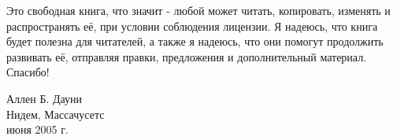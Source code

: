Это свободная книга, что значит - любой может читать, копировать,
изменять и распространять её, при условии соблюдения лицензии.
Я надеюсь, что книга будет полезна для читателей, а также я надеюсь, что
они помогут продолжить развивать её, отправляя правки, предложения
и дополнительный материал.
Спасибо!

\vspace{0.3in}

\noindent Аллен Б. Дауни \\
\noindent Нидем, Массачусетс \\
 июня 2005 г. \\

